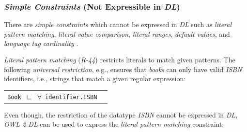 \documentclass[a4paper,fontsize=11pt]{scrartcl}
\newcommand{\ms}[1]{\texttt{#1}}
\newenvironment{DL}{
  \vspace{0cm}
	\begin{center}
  \begin{tabular}{r l}

}{
  \end{tabular}
	\end{center}
}
\begin{document}
\subsubsection{\emph{Simple Constraints} (Not Expressible in \emph{DL})}

There are \emph{simple constraints} which cannot be expressed in \emph{DL} such as \emph{literal pattern matching}, \emph{literal value comparison}, \emph{literal ranges}, \emph{default values}, and \emph{language tag cardinality} \cite{BoschNolleAcarEckert2015}.

{\em Literal pattern matching} (\emph{R-44}) restricts literals to match given patterns.
The following \emph{universal restriction}, e.g., ensures that \emph{books} can only have valid \emph{ISBN} identifiers, 
i.e., strings that match a given regular expression:
\begin{DL}
\ms{Book $\sqsubseteq$ $\forall$ identifier.ISBN} 
\end{DL}
Even though, the restriction of the datatype \emph{ISBN} cannot be expressed in \emph{DL}, \emph{OWL 2 DL} can be used to express the \emph{literal pattern matching} constraint:
\end{document}
